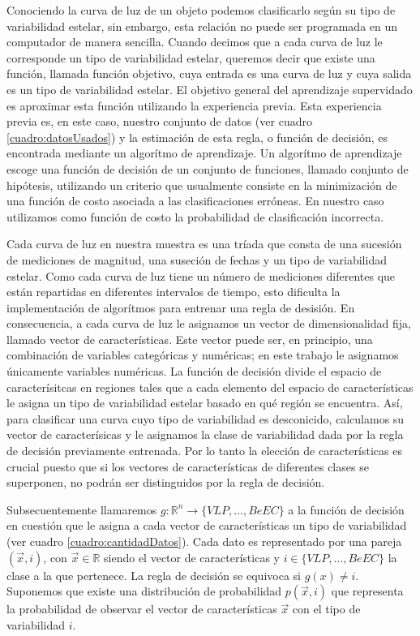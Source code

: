 \documentclass[letterpaper,12pt]{book}
\begin{document}
Conociendo la curva de luz de un objeto podemos clasificarlo según su tipo de variabilidad estelar, sin embargo, esta relación no puede ser programada en un computador de manera sencilla. Cuando decimos que a cada curva de luz le corresponde un tipo de variabilidad estelar, queremos decir que existe una función, llamada función objetivo, cuya entrada es una curva de luz y cuya salida es un tipo de variabilidad estelar. El objetivo general del aprendizaje supervidado es aproximar esta función utilizando la experiencia previa. Esta experiencia previa es, en este caso, nuestro conjunto de datos (ver cuadro \ref{cuadro:datosUsados}) y la estimación de esta regla, o función de decisión, es encontrada mediante un algorítmo de aprendizaje. Un algorítmo de aprendizaje escoge una función de decisión de un conjunto de funciones, llamado conjunto de hipótesis, utilizando un criterio que usualmente consiste en la minimización de una función de costo asociada a las clasificaciones erróneas. En nuestro caso utilizamos como función de costo la probabilidad de clasificación incorrecta.

Cada curva de luz en nuestra muestra es una tríada que consta de una sucesión de mediciones de magnitud, una suseción de fechas y un tipo de variabilidad estelar. Como cada curva de luz tiene un número de mediciones diferentes que están repartidas en diferentes intervalos de tiempo, esto dificulta la implementación de algorítmos para entrenar una regla de desisión. En consecuencia, a cada curva de luz le asignamos un vector de dimensionalidad fija, llamado vector de características. Este vector puede ser, en principio, una combinación de variables categóricas y numéricas; en este trabajo le asignamos únicamente variables numéricas. La función de decisión divide el espacio de caracterísitcas en regiones tales que a cada elemento del espacio de características le asigna un tipo de variabilidad estelar basado en qué región se encuentra. Así, para clasificar una curva cuyo tipo de variabilidad es desconicido, calculamos su vector de caracterísicas y le asignamos la clase de variabilidad dada por la regla de decisión previamente entrenada. Por lo tanto la elección de características es crucial puesto que si los vectores de características de diferentes clases se superponen, no podrán ser distinguidos por la regla de decisión.

Subsecuentemente llamaremos $g:\mathbb{R}^{n}\rightarrow \{VLP,\dots, BeEC\}$ a la función de decisión en cuestión que le asigna a cada vector de características un tipo de variabilidad (ver cuadro \ref{cuadro:cantidadDatos}). Cada dato es representado por una pareja $(\vec{x}, i)$, con $\vec{x}\in\mathbb{R}$ siendo el vector de características y $i\in\{VLP,\dots, BeEC\}$ la clase a la que pertenece. La regla de decisión se equivoca si  $g(x)\neq i$. Suponemos que existe una distribución de probabilidad $p(\vec{x},i)$ que representa la probabilidad de observar el vector de características $\vec{x}$ con el tipo de variabilidad $i$.
\end{document}
